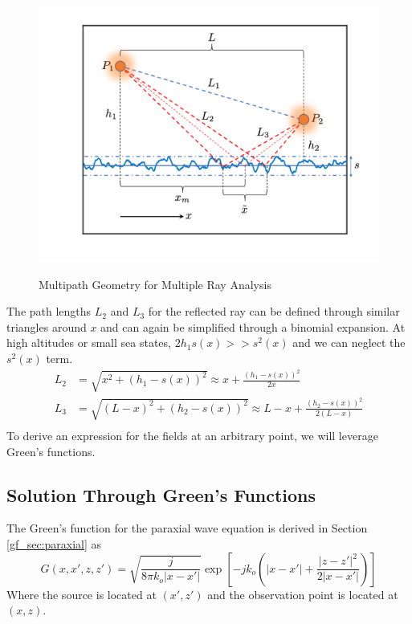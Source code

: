 \begin{figure}[H]
  \begin{center}
\includegraphics[width=5in]{../media/analysis/multipath_layout.png}
  \end{center}
  \renewcommand{\baselinestretch}{1} \small\normalsize
  \begin{quote}
    \caption[Multipath Geometry for Multiple Ray Analysis]{Multipath Geometry for Multiple Ray Analysis\label{mp_fig:2}}
  \end{quote}
\end{figure}
\renewcommand{\baselinestretch}{2} \small\normalsize

The path lengths  $L_2$ and $L_3$ for the reflected ray can be defined through similar triangles around $x$ and can again be simplified through a binomial expansion. At high altitudes or small sea states, $2h_1s(x) >> s^2(x)$ and we can neglect the $s^2(x)$ term.
\begin{equation}
\begin{aligned}
L_2 &= \sqrt{x^2 + \left( h_1 - s(x)\right)^2}  \approx x + \frac{(h_1-s(x))^2}{2x}\\
L_3 & = \sqrt{\left(L - x\right)^2 + \left( h_2 - s(x)\right)^2}  \approx L-x + \frac{(h_2 - s(x))^2}{2\left(L-x\right)}\\
\end{aligned}
\label{mp_eq:12}
\end{equation}
\renewcommand{\baselinestretch}{2} \small\normalsize
To derive an expression for the fields at an arbitrary point, we will leverage Green's functions.

\subsection{Solution Through Green's Functions}
The Green's function for the paraxial wave equation is derived in Section \ref{gf_sec:paraxial} as
\begin{equation}
G\left(x,x',z,z' \right)= \sqrt{\frac{j}{8\pi k_o|x-x'|}}\exp\left[-jk_o\left(|x -x'| + \frac{|z-z'|^2}{2|x-x'|}\right) \right]
\label{mp_eq:11aa}
\end{equation}
\renewcommand{\baselinestretch}{2} \small\normalsize
Where the source is located at $(x',z')$ and the observation point is located at $(x,z)$.


